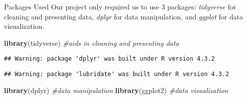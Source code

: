 \documentclass[
  ignorenonframetext,
]{beamer}
\newenvironment{Shaded}{\begin{snugshade}}{\end{snugshade}}
\newcommand{\CommentTok}[1]{\textcolor[rgb]{0.56,0.35,0.01}{\textit{#1}}}
\newcommand{\FunctionTok}[1]{\textcolor[rgb]{0.13,0.29,0.53}{\textbf{#1}}}
\newcommand{\NormalTok}[1]{#1}
\begin{document}
\begin{frame}[fragile]{Packages Used}
\protect\hypertarget{packages-used}{}
Our project only required us to use 3 packages: \emph{tidyverse} for
cleaning and presenting data, \emph{dplyr} for data manipulation, and
\emph{ggplot} for data visualization.

\begin{Shaded}
\begin{Highlighting}[]
\FunctionTok{library}\NormalTok{(tidyverse) }\CommentTok{\#aids in cleaning and presenting data}
\end{Highlighting}
\end{Shaded}

\begin{verbatim}
## Warning: package 'dplyr' was built under R version 4.3.2
\end{verbatim}

\begin{verbatim}
## Warning: package 'lubridate' was built under R version 4.3.2
\end{verbatim}

\begin{Shaded}
\begin{Highlighting}[]
\FunctionTok{library}\NormalTok{(dplyr) }\CommentTok{\#data manipulation}
\FunctionTok{library}\NormalTok{(ggplot2) }\CommentTok{\#data visualization}
\end{Highlighting}
\end{Shaded}
\end{frame}
\end{document}
